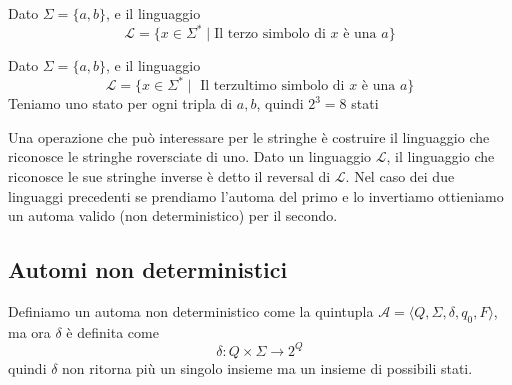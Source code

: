 \documentclass[12pt]{report}
\begin{document}
\begin{tcolorbox}
	Dato $\Sigma = \{ a, b \}$, e il linguaggio 
	$$ \mathscr{L} = \{ x \in \Sigma^* \mid \text{Il terzo simbolo di $x$ è una $a$}\}$$
	\begin{center}
	\end{center}
\end{tcolorbox}
\begin{tcolorbox}
	Dato $\Sigma = \{ a, b \}$, e il linguaggio 
	$$ \mathscr{L} = \{ x \in \Sigma^* \mid \text{ Il terzultimo simbolo di $x$ è una $a$} \} $$
	Teniamo uno stato per ogni tripla di $a, b$, quindi $2^3 = 8$ stati
\end{tcolorbox}

Una operazione che può interessare per le stringhe è costruire il linguaggio che riconosce le stringhe roversciate di uno.
Dato un linguaggio $\mathscr{L}$, il linguaggio che riconosce le sue stringhe inverse è detto il reversal di $\mathscr{L}$.
Nel caso dei due linguaggi precedenti se prendiamo l'automa del primo e lo invertiamo ottieniamo un automa valido (non deterministico) per il secondo.

\subsection{Automi non deterministici}
Definiamo un automa non deterministico come la quintupla $\mathscr{A} = \langle Q, \Sigma, \delta, q_0, F \rangle$, ma ora $\delta$ è definita come
$$ \delta : Q \times \Sigma \rightarrow 2^Q $$
quindi $\delta$ non ritorna più un singolo insieme ma un insieme di possibili stati.
\end{document}
